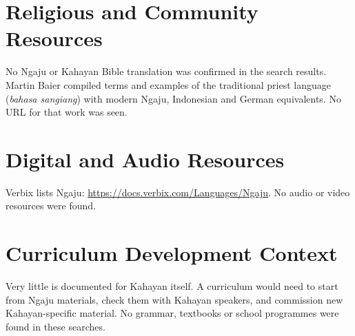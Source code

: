 \documentclass[12pt]{article}
\begin{document}
\section{Religious and Community Resources}
No Ngaju or Kahayan Bible translation was confirmed in the search results. Martin Baier compiled terms and examples of the traditional priest language (\emph{bahasa sangiang}) with modern Ngaju, Indonesian and German equivalents. No URL for that work was seen.

\section{Digital and Audio Resources}
Verbix lists Ngaju: \url{https://docs.verbix.com/Languages/Ngaju}. No audio or video resources were found.

\section{Curriculum Development Context}
Very little is documented for Kahayan itself. A curriculum would need to start from Ngaju materials, check them with Kahayan speakers, and commission new Kahayan-specific material. No grammar, textbooks or school programmes were found in these searches.
\end{document}
